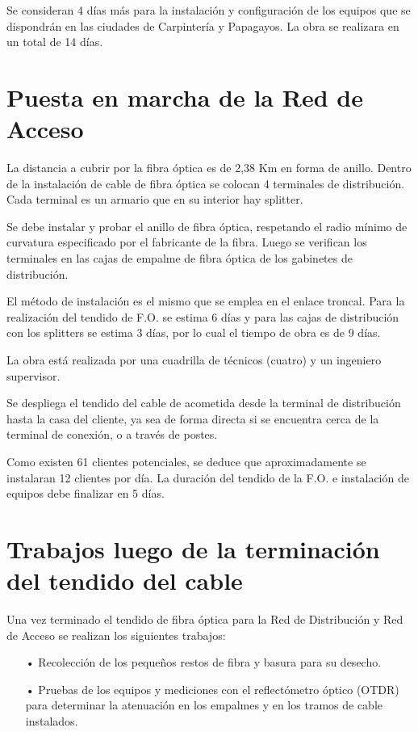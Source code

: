 Se consideran 4 días más para la instalación y configuración de los equipos que se dispondrán en las ciudades de Carpintería y Papagayos. La obra se realizara en un total de 14 días.

\section{Puesta en marcha de la Red de Acceso}
La distancia a cubrir por la fibra óptica es de 2,38 Km en forma de anillo. Dentro de la instalación de cable de fibra óptica se colocan 4 terminales de distribución. Cada terminal es un armario que en su interior hay splitter.

Se debe instalar y probar el anillo de fibra óptica, respetando el radio mínimo de curvatura especificado por el fabricante de la fibra. 
Luego se verifican los terminales en las cajas de empalme de fibra óptica de los gabinetes de distribución.

El método de instalación es el mismo que se emplea en el enlace troncal. Para la realización del tendido de F.O. se estima 6 días y para las cajas de distribución con los splitters se estima 3 días, por lo cual el tiempo de obra es de 9 días.

La obra está realizada por una cuadrilla de técnicos (cuatro) y un ingeniero supervisor.

Se despliega el tendido del cable de acometida desde la terminal de distribución hasta la casa del cliente, ya sea de forma directa si se encuentra cerca de la terminal de conexión, o a través de postes.

Como existen 61 clientes potenciales, se deduce que aproximadamente se instalaran 12 clientes por día. La duración del tendido de la F.O. e instalación de equipos debe finalizar en 5 días.
\section{Trabajos luego de la terminación del tendido del cable}

Una vez terminado el tendido de fibra óptica para la Red de Distribución y Red de Acceso se realizan los siguientes trabajos:

\begin{itemize}

\item[•]Recolección de los pequeños restos de fibra y basura para su desecho.

\item[•]Pruebas de los equipos y mediciones con el reflectómetro óptico (OTDR) para determinar la atenuación en los empalmes y en los tramos de cable instalados.
\end{itemize}

